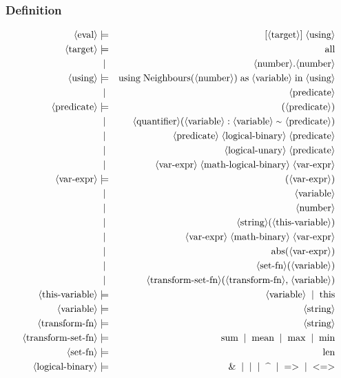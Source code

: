 \subsubsection{Definition}
\begin{eqnarray*}
	\pn{eval} & \pp & [ \pn{target} ] \ww \pn{using} \\
	\pn{target} & \pp & \sm{all} \\
	~ & \oo & \pn{number}\sm{.}\pn{number} \\
%
	\pn{using} & \pp & \sm{using} \ww \sm{Neighbours}\sm{(}\pn{number}\sm{)} \ww \sm{as} \ww \pn{variable} \ww \sm{in} \ww \pn{using} \\
	~ & \oo & \pn{predicate} \\
%
	\pn{predicate} & \pp &  \sm{(}\pn{predicate}\sm{)} \\
	~ & \oo & \pn{quantifier}\sm{(}\pn{variable} \ww \sm{:} \ww \pn{variable} \ww \sm{\mytilde} \pn{predicate} \sm{)}\\
	~ & \oo &  \pn{predicate} \ww \pn{logical-binary} \ww \pn{predicate} \\
	~ & \oo &  \pn{logical-unary} \ww \pn{predicate} \\
	~ & \oo &  \pn{var-expr} \ww \pn{math-logical-binary} \ww \pn{var-expr} \\
%
	\pn{var-expr} & \pp & \sm{(}\pn{var-expr}\sm{)} \\
	~ & \oo & \pn{variable} \\
	~ & \oo & \pn{number} \\
	~ & \oo & \pn{string}\sm{(}\pn{this-variable}\sm{)} \\
	~ & \oo & \pn{var-expr} \ww \pn{math-binary} \ww \pn{var-expr} \\
	~ & \oo & \sm{abs}\sm{(}\pn{var-expr}\sm{)} \\
	~ & \oo & \pn{set-fn}\sm{(}\pn{variable}\sm{)} \\
	~ & \oo & \pn{transform-set-fn}\sm{(}\pn{transform-fn}\sm{,} \ww \pn{variable}\sm{)} \\
%
	\pn{this-variable} & \pp & \pn{variable} \oo \sm{this} \\
	\pn{variable} & \pp & \pn{string} \\
%
	\pn{transform-fn} & \pp & \pn{string} \\
	\pn{transform-set-fn} & \pp & \sm{sum} \oo  \sm{mean} \oo \sm{max} \oo \sm{min} \\
	\pn{set-fn} & \pp & \sm{len} \\
%
	\pn{logical-binary} & \pp & \sm{\&}  \oo \sm{\textbar} \oo \sm{\textasciicircum} \oo \sm{=\textgreater} \oo \sm{\textless=\textgreater} \\

\end{eqnarray*}
